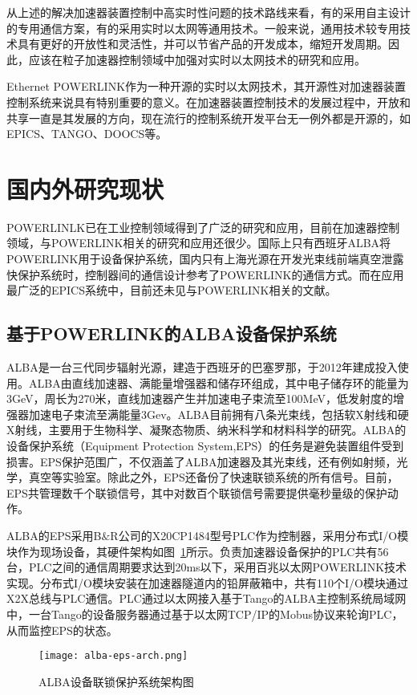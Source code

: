 从上述的解决加速器装置控制中高实时性问题的技术路线来看，有的采用自主设计的专用通信方案，有的采用实时以太网等通用技术。一般来说，通用技术较专用技术具有更好的开放性和灵活性，并可以节省产品的开发成本，缩短开发周期。因此，应该在粒子加速器控制领域中加强对实时以太网技术的研究和应用。

Ethernet POWERLINK作为一种开源的实时以太网技术，其开源性对加速器装置控制系统来说具有特别重要的意义。在加速器装置控制技术的发展过程中，开放和共享一直是其发展的方向，现在流行的控制系统开发平台无一例外都是开源的，如EPICS、TANGO、DOOCS等。

\section{国内外研究现状}
POWERLINLK已在工业控制领域得到了广泛的研究和应用\cite{xu-2015,zhu-2014,shi-2012,huang-2012,Seno-2007,cena-2009}，目前在加速器控制领域，与POWERLINK相关的研究和应用还很少。国际上只有西班牙ALBA将POWERLINK用于设备保护系统，国内只有上海光源在开发光束线前端真空泄露快保护系统时，控制器间的通信设计参考了POWERLINK的通信方式。而在应用最广泛的EPICS系统中，目前还未见与POWERLINK相关的文献。

\subsection{基于POWERLINK的ALBA设备保护系统}
ALBA是一台三代同步辐射光源，建造于西班牙的巴塞罗那，于2012年建成投入使用。ALBA由直线加速器、满能量增强器和储存环组成，其中电子储存环的能量为3GeV，周长为270米，直线加速器产生并加速电子束流至100MeV，低发射度的增强器加速电子束流至满能量3Gev。ALBA目前拥有八条光束线，包括软X射线和硬X射线，主要用于生物科学、凝聚态物质、纳米科学和材料科学的研究。ALBA的设备保护系统（Equipment Protection System,EPS）的任务是避免装置组件受到损害。EPS保护范围广，不仅涵盖了ALBA加速器及其光束线，还有例如射频，光学，真空等实验室。除此之外，EPS还备份了快速联锁系统的所有信号。目前，EPS共管理数千个联锁信号，其中对数百个联锁信号需要提供毫秒量级的保护动作。

ALBA的EPS采用B$\&$R公司的X20CP1484型号PLC作为控制器，采用分布式I/O模块作为现场设备，其硬件架构如图~\ref{fig:alba-eps-arch}所示。负责加速器设备保护的PLC共有56台，PLC之间的通信周期要求达到20ms以下，采用百兆以太网POWERLINK技术实现。分布式I/O模块安装在加速器隧道内的铅屏蔽箱中，共有110个I/O模块通过X2X总线与PLC通信\cite{Alba-eps}。PLC通过以太网接入基于Tango的ALBA主控制系统局域网中，一台Tango的设备服务器通过基于以太网TCP/IP的Mobus协议来轮询PLC，从而监控EPS的状态。

\begin{figure}[!htb]
	\centering
	\texttt{[image: alba-eps-arch.png]}
	\caption{ALBA设备联锁保护系统架构图}
	\label{fig:alba-eps-arch}
\end{figure}

